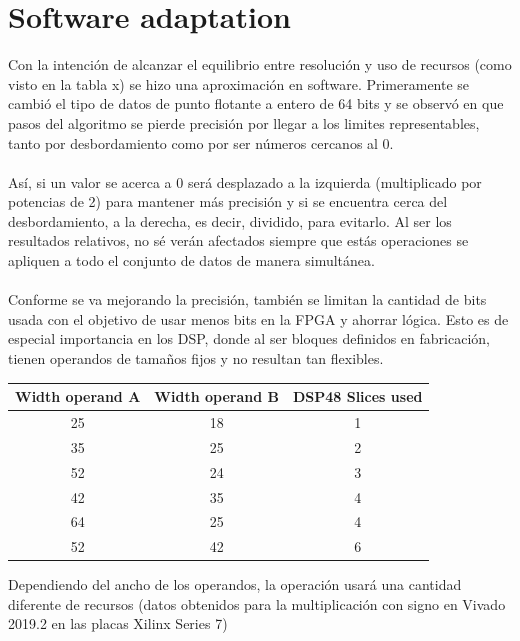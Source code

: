 \section{Software adaptation}
Con la intención de alcanzar el equilibrio entre resolución y uso de recursos (como visto en la tabla x) se hizo una aproximación en software. Primeramente se cambió el tipo de datos de punto flotante a entero de 64 bits y se observó en que pasos del algoritmo se pierde precisión por llegar a los limites representables, tanto por desbordamiento como por ser números cercanos al 0.
\\
\\
Así, si un valor se acerca a 0 será desplazado a la izquierda (multiplicado por potencias de 2) para mantener más precisión y si se encuentra cerca del desbordamiento, a la derecha, es decir, dividido, para evitarlo. Al ser los resultados relativos, no sé verán afectados siempre que estás operaciones se apliquen a todo el conjunto de datos de manera simultánea.
\\
\\
Conforme se va mejorando la precisión, también se limitan la cantidad de bits usada con el objetivo de usar menos bits en la FPGA y ahorrar lógica. Esto es de especial importancia en los DSP, donde al ser bloques definidos en fabricación, tienen operandos de tamaños fijos y no resultan tan flexibles.
\\
\begin{center}
 \begin{tabular}{|c c |c|} 
 \hline
 Width operand A & Width operand B & DSP48 Slices used \\ [0.5ex] 
 \hline\hline
 25 & 18 & 1 \\ 
 \hline
 35 & 25 & 2 \\
 \hline
 52 & 24 & 3 \\
 \hline
 42 & 35 & 4 \\
 \hline
 64 & 25 & 4 \\
 \hline
 52 & 42 & 6 \\ [1ex] 
 \hline
\end{tabular}
\end{center}
Dependiendo del ancho de los operandos, la operación usará una cantidad diferente de recursos (datos obtenidos para la multiplicación con signo en Vivado 2019.2 en las placas Xilinx Series 7)


